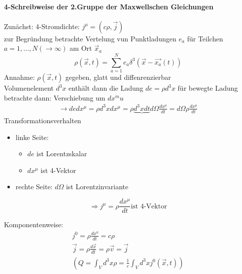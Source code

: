 \documentclass[a4paper]{article}
\begin{document}
\paragraph{4-Schreibweise der 2.Gruppe der Maxwellschen Gleichungen}
Zunächst: 4-Stromdichte: $j^\mu=(c\rho,\vec{j})$\\
zur Begründung betrachte Vertelung vun Punktladungen $e_a$ für Teilchen 
$a=1,\ldots,N(\rightarrow \infty)$ am Ort $\vec{x}_a$
\begin{equation}
\rho(\vec{x},t)=\sum_{a=1}^N e_a\delta^3(\vec{x}-\vec{x_a}(t))
\end{equation}
Annahme: $\rho(\vec{x},t)$ gegeben, glatt und diffenrenzierbar\\
Volumenelement $d^3x$ enthält dann die Ladung $de=\rho d^3x$
für bewegte Ladung betrachte dann: Verschiebung um $dx^mu$
\begin{align}
\rightarrow de dx^\mu=\rho d^3x dx^\mu=\rho
\underbrace{d^3xdt}{d\Omega}\frac{dx^\mu}{dt}
=d\Omega \rho \frac{d x^\mu}{dt}
\end{align}
Transformationsverhalten
\begin{itemize}
  \item linke Seite:
	\begin{itemize}
  		\item $de$ ist Lorentzskalar
  		\item $dx^\mu$ ist 4-Vektor 
	\end{itemize}
  \item rechte Seite: $d\Omega$ ist Lorentzinvariante
\end{itemize}
\begin{equation}
\Rightarrow j^\mu=\rho\frac{dx^\mu}{dt} \text{ist 4-Vektor}
\end{equation}

Komponentenweise:
\begin{align}
j^0=\rho \frac{dx^0}{dt}=c\rho\\
\vec{j}=\rho\frac{d\vec{x}}{dt}=\rho\vec{v}=\vec{j}\\
\left( Q=\int_V d^3x\rho=\frac{1}{c}\int_V d^3xj^0(\vec{x},t) \right)
\end{align}
\end{document}
